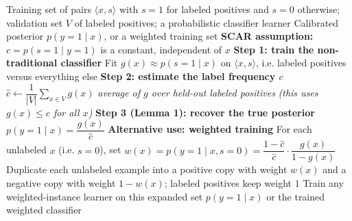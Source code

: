 \documentclass{article}
\begin{document}
\begin{algorithm}[!h]
\renewcommand{\algorithmicrequire}{\textbf{Input:}}
\renewcommand{\algorithmicensure}{\textbf{Output:}}
	\caption{Elkan-Noto correction}
	\begin{algorithmic}[1]
	    \REQUIRE
	    Training set of pairs $\langle x,s\rangle$ with $s=1$ for labeled positives and
	    $s=0$ otherwise; validation set $V$ of labeled positives;
	    a probabilistic classifier learner
	    \ENSURE
	    Calibrated posterior $p(y=1\mid x)$, or a weighted training set
	    \STATE \textbf{SCAR assumption:} $c=p(s=1\mid y=1)$ is a constant, independent of $x$ %
	    \STATE \textbf{Step 1: train the non-traditional classifier}
	    \STATE Fit $g(x)\approx p(s=1\mid x)$ on $\langle x,s\rangle$, i.e. labeled positives
	    versus everything else %
	    \STATE \textbf{Step 2: estimate the label frequency $c$}
	    \STATE $\hat{c}\leftarrow \dfrac{1}{|V|}\sum_{x\in V}g(x)$
	    \hfill \emph{average of $g$ over held-out labeled positives} %
	    \STATE \quad \emph{(this uses $g(x)\leq c$ for all $x$)}
	    \STATE \textbf{Step 3 (Lemma 1): recover the true posterior}
	    \STATE $p(y=1\mid x)=\dfrac{g(x)}{\hat{c}}$ %
	    \STATE \textbf{Alternative use: weighted training}
	    \STATE For each unlabeled $x$ (i.e. $s=0$), set
	    $w(x)=p(y=1\mid x,s=0)=\dfrac{1-\hat{c}}{\hat{c}}\cdot\dfrac{g(x)}{1-g(x)}$ %
	    \STATE Duplicate each unlabeled example into a positive copy with weight $w(x)$ and a
	    negative copy with weight $1-w(x)$; labeled positives keep weight $1$
	    \STATE Train any weighted-instance learner on this expanded set
		\RETURN $p(y=1\mid x)$ or the trained weighted classifier
	\end{algorithmic}
\end{algorithm}
\end{document}
